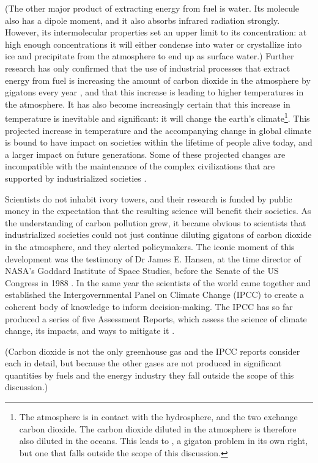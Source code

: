 (The other major product of extracting energy from fuel is water. Its molecule
also has a dipole moment, and it also absorbs infrared radiation strongly.
However, its intermolecular properties set an upper limit to its concentration:
at high enough concentrations it will either condense into water or crystallize
into ice and precipitate from the atmosphere to end up as surface water.)
Further research has only confirmed that the use of industrial processes that
extract energy from fuel is increasing the amount of carbon dioxide in the
atmosphere by gigatons every year \autocite{Xu2010}, and that this increase is
leading to higher temperatures in the atmosphere. It has also become
increasingly certain that this increase in temperature is inevitable and
significant: it will change the earth's climate\footnote{The atmosphere is in
contact with the hydrosphere, and the two exchange carbon dioxide. The carbon
dioxide diluted in the atmosphere is therefore also diluted in the oceans. This
leads to , a gigaton problem in its own right, but
one that falls outside the scope of this discussion.}. This projected increase
in temperature and the accompanying change in global climate is bound to have
impact on societies within the lifetime of people alive today, and a larger
impact on future generations. Some of these projected changes are incompatible
with the maintenance of the complex civilizations that are supported by
industrialized societies \autocite{IPCC2014}.

Scientists do not inhabit ivory towers, and their research is funded by public
money in the expectation that the resulting science will benefit their
societies. As the understanding of carbon pollution grew, it became obvious to
scientists that industrialized societies could not just continue diluting
gigatons of carbon dioxide in the atmosphere, and they alerted policymakers. The
iconic moment of this development was the testimony of Dr James E. Hansen, at
the time director of NASA's Goddard Institute of Space Studies, before the
Senate of the US Congress in 1988 \autocite{Shabecoff1988}. In the same year the
scientists of the world came together and established the Intergovernmental
Panel on Climate Change (IPCC) to create a coherent body of knowledge to inform
decision-making. The IPCC has so far produced a series of five Assessment
Reports, which assess the science of climate change, its impacts, and ways to
mitigate it \autocite{Allen2014}.

(Carbon dioxide is not the only greenhouse gas and the IPCC reports consider
each in detail, but because the other gases are not produced in significant
quantities by fuels and the energy industry they fall outside the scope of this
discussion.)

